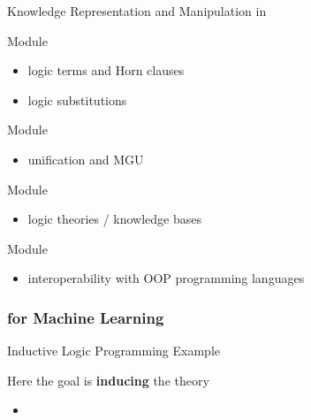 \documentclass[presentation]{beamer}\mode<presentation>{\usetheme{AMSBolognaFC}}
\begin{document}
\begin{frame}{Knowledge Representation and Manipulation in \twopkt}
    \begin{block}{Module }
        \begin{multicols}{2}
            \begin{itemize}
                \item logic terms and Horn clauses
                \item logic substitutions
            \end{itemize}
        \end{multicols}
    \end{block}

    \begin{block}{Module }
        \begin{itemize}
            \item unification and MGU
        \end{itemize}
    \end{block}

    \begin{block}{Module }
        \begin{itemize}
            \item logic theories / knowledge bases
        \end{itemize}
    \end{block}

    \begin{block}{Module }
        \begin{itemize}
            \item interoperability with OOP programming languages
        \end{itemize}
    \end{block}
\end{frame}

\subsubsection{\twopkt{} for Machine Learning}

\begin{frame}{Inductive Logic Programming Example}
    \begin{exampleblock}{Here the goal is \textbf{inducing} the theory}
        \begin{itemize}
            \item {}
        \end{itemize}
    \end{exampleblock}
\end{frame}
\end{document}
